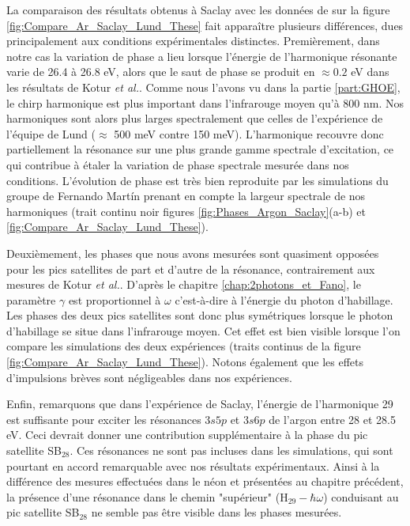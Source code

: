 La comparaison des résultats obtenus à Saclay avec les données de  sur la figure \ref{fig:Compare_Ar_Saclay_Lund_These} fait apparaître plusieurs différences, dues principalement aux conditions expérimentales distinctes. Premièrement, dans notre cas la variation de phase a lieu lorsque l'énergie de l'harmonique résonante varie de 26.4 à 26.8 eV, alors que le saut de phase se produit en $\approx 0.2$ eV dans les résultats de Kotur \textit{et al.}. Comme nous l'avons vu dans la partie \ref{part:GHOE}, le chirp harmonique est plus important dans l'infrarouge moyen qu'à 800 nm. Nos harmoniques sont alors plus larges spectralement que celles de l'expérience de l'équipe de Lund ($\approx$ 500 meV contre 150 meV). L'harmonique recouvre donc partiellement la résonance sur une plus grande gamme spectrale d'excitation, ce qui contribue à étaler la variation de phase spectrale mesurée dans nos conditions. L'évolution de phase est très bien reproduite par les simulations du groupe de Fernando Mart\'{i}n prenant en compte la largeur spectrale de nos harmoniques (trait continu noir figures 
\ref{fig:Phases_Argon_Saclay}(a-b) et \ref{fig:Compare_Ar_Saclay_Lund_These}).

Deuxièmement, les phases que nous avons mesurées sont quasiment opposées pour les pics satellites de part et d'autre de la résonance, contrairement aux mesures de Kotur \textit{et al.}. D'après le chapitre \ref{chap:2photons_et_Fano}, le paramètre $\gamma$ est proportionnel à $\omega$ c'est-à-dire à l'énergie du photon d'habillage. Les phases des deux pics satellites sont donc plus symétriques lorsque le photon d'habillage se situe dans l'infrarouge moyen. Cet effet est bien visible lorsque l'on compare les simulations des deux expériences (traits continus de la figure \ref{fig:Compare_Ar_Saclay_Lund_These}). Notons également que les effets d'impulsions brèves sont négligeables dans nos expériences. 

Enfin, remarquons que dans l'expérience de Saclay, l'énergie de l'harmonique 29 est suffisante pour exciter les résonances $3s5p$ et $3s6p$ de l'argon entre 28 et 28.5 eV. Ceci devrait donner une contribution supplémentaire à la phase du pic satellite SB$_{28}$. Ces résonances ne sont pas incluses dans les simulations, qui sont pourtant en accord remarquable avec nos résultats expérimentaux. Ainsi à la différence des mesures effectuées dans le néon et présentées au chapitre précédent, la présence d'une résonance dans le chemin "supérieur" (H$_{29} - \hbar \omega$) conduisant au pic satellite SB$_{28}$ ne semble pas être visible dans les phases mesurées.

